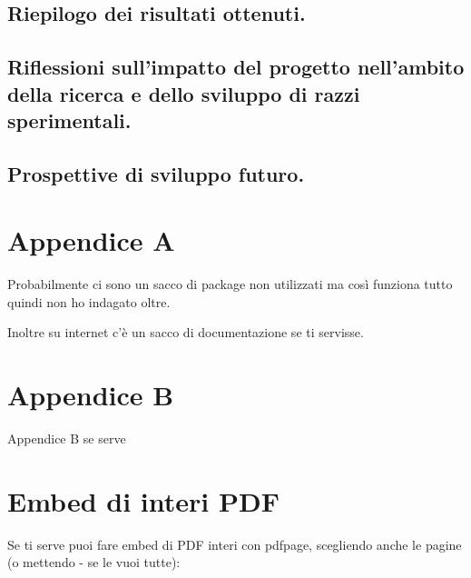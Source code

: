 \documentclass[12pt,a4paper,twoside]{book}
\begin{document}
\section{Riepilogo dei risultati ottenuti.}
\section{Riflessioni sull'impatto del progetto nell'ambito della ricerca e dello sviluppo di razzi sperimentali.}
\section{Prospettive di sviluppo futuro.}

\renewcommand{\appendixtocname}{Appendici}
\renewcommand{\appendixpagename}{Appendici}
{}
\begin{appendices}
    \chapter{Appendice A}
    \label{Appendice:A}
    Probabilmente ci sono un sacco di package non utilizzati ma così funziona tutto quindi non ho indagato oltre.

    Inoltre su internet c'è un sacco di documentazione se ti servisse.
    \chapter{Appendice B}
    \label{Appendice:B}
    Appendice B se serve

    \chapter{Embed di interi PDF}
    \label{Appendice:C}
    Se ti serve puoi fare embed di PDF interi con pdfpage, scegliendo anche le pagine (o mettendo - se le vuoi tutte):

\end{appendices}
\end{document}
